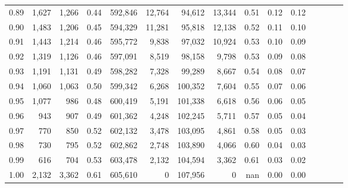 \begin{tabular}{rrrcrrrrrrrrrrr}
0.89 &   1,627 &  1,266 &                                       0.44 &  592,846 &   12,764 &   94,612 &   13,344 &  0.51 &  0.12 &                         0.12 \\
0.90 &   1,483 &  1,206 &                                       0.45 &  594,329 &   11,281 &   95,818 &   12,138 &  0.52 &  0.11 &                         0.10 \\
0.91 &   1,443 &  1,214 &                                       0.46 &  595,772 &    9,838 &   97,032 &   10,924 &  0.53 &  0.10 &                         0.09 \\
0.92 &   1,319 &  1,126 &                                       0.46 &  597,091 &    8,519 &   98,158 &    9,798 &  0.53 &  0.09 &                         0.08 \\
0.93 &   1,191 &  1,131 &                                       0.49 &  598,282 &    7,328 &   99,289 &    8,667 &  0.54 &  0.08 &                         0.07 \\
0.94 &   1,060 &  1,063 &                                       0.50 &  599,342 &    6,268 &  100,352 &    7,604 &  0.55 &  0.07 &                         0.06 \\
0.95 &   1,077 &    986 &                                       0.48 &  600,419 &    5,191 &  101,338 &    6,618 &  0.56 &  0.06 &                         0.05 \\
0.96 &     943 &    907 &                                       0.49 &  601,362 &    4,248 &  102,245 &    5,711 &  0.57 &  0.05 &                         0.04 \\
0.97 &     770 &    850 &                                       0.52 &  602,132 &    3,478 &  103,095 &    4,861 &  0.58 &  0.05 &                         0.03 \\
0.98 &     730 &    795 &                                       0.52 &  602,862 &    2,748 &  103,890 &    4,066 &  0.60 &  0.04 &                         0.03 \\
0.99 &     616 &    704 &                                       0.53 &  603,478 &    2,132 &  104,594 &    3,362 &  0.61 &  0.03 &                         0.02 \\
1.00 &   2,132 &  3,362 &                                       0.61 &  605,610 &        0 &  107,956 &        0 &   nan &  0.00 &                         0.00 \\
\bottomrule
\end{tabular}
